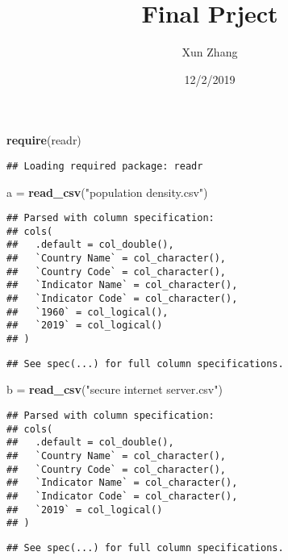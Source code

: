 \documentclass[ignorenonframetext,]{beamer}
\title{Final Prject}
\author{Xun Zhang}
\date{12/2/2019}
\newenvironment{Shaded}{\begin{snugshade}}{\end{snugshade}}
\newcommand{\KeywordTok}[1]{\textcolor[rgb]{0.13,0.29,0.53}{\textbf{#1}}}
\newcommand{\NormalTok}[1]{#1}
\newcommand{\StringTok}[1]{\textcolor[rgb]{0.31,0.60,0.02}{#1}}
\begin{document}
\frame{\titlepage}

\begin{frame}[fragile]

\begin{Shaded}
\begin{Highlighting}[]
\KeywordTok{require}\NormalTok{(readr)}
\end{Highlighting}
\end{Shaded}

\begin{verbatim}
## Loading required package: readr
\end{verbatim}

\begin{Shaded}
\begin{Highlighting}[]
\NormalTok{a =}\StringTok{ }\KeywordTok{read_csv}\NormalTok{(}\StringTok{"population density.csv"}\NormalTok{)}
\end{Highlighting}
\end{Shaded}

\begin{verbatim}
## Parsed with column specification:
## cols(
##   .default = col_double(),
##   `Country Name` = col_character(),
##   `Country Code` = col_character(),
##   `Indicator Name` = col_character(),
##   `Indicator Code` = col_character(),
##   `1960` = col_logical(),
##   `2019` = col_logical()
## )
\end{verbatim}

\begin{verbatim}
## See spec(...) for full column specifications.
\end{verbatim}

\begin{Shaded}
\begin{Highlighting}[]
\NormalTok{b =}\StringTok{ }\KeywordTok{read_csv}\NormalTok{(}\StringTok{"secure internet server.csv"}\NormalTok{)}
\end{Highlighting}
\end{Shaded}

\begin{verbatim}
## Parsed with column specification:
## cols(
##   .default = col_double(),
##   `Country Name` = col_character(),
##   `Country Code` = col_character(),
##   `Indicator Name` = col_character(),
##   `Indicator Code` = col_character(),
##   `2019` = col_logical()
## )
\end{verbatim}

\begin{verbatim}
## See spec(...) for full column specifications.
\end{verbatim}


\end{frame}
\end{document}

